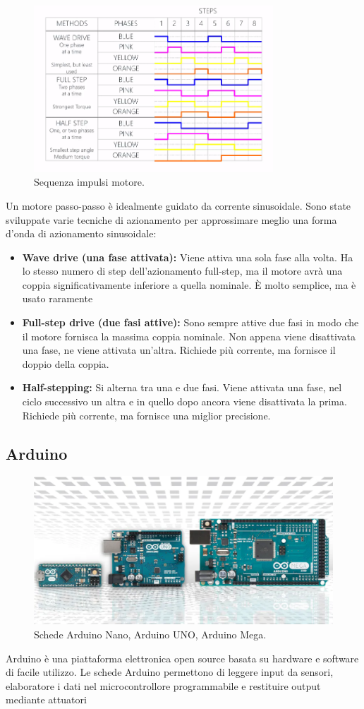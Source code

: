 \documentclass[12pt,oneside,a4paper]{article}
\begin{document}
\begin{figure}[ht!]
    \centering
    \includegraphics[width=0.8\textwidth]{figures/motor-sequence.png}
    \caption{Sequenza impulsi motore.}
\end{figure}
Un motore passo-passo è idealmente guidato da corrente sinusoidale. Sono state sviluppate varie tecniche di azionamento per approssimare meglio una forma d'onda di azionamento sinusoidale:
\begin{itemize}
    \item \textbf{Wave drive (una fase attivata): } Viene attiva una sola fase alla volta. Ha lo stesso numero di step dell'azionamento full-step, ma il motore avrà una coppia significativamente inferiore a quella nominale. È molto semplice, ma è usato raramente
    \item \textbf{Full-step drive (due fasi attive): } Sono sempre attive due fasi in modo che il motore fornisca la massima coppia nominale. Non appena viene disattivata una fase, ne viene attivata un'altra. Richiede più corrente, ma fornisce il doppio della coppia.
    \item \textbf{Half-stepping: } Si alterna tra una e due fasi. Viene attivata una fase, nel ciclo successivo un altra e in quello dopo ancora viene disattivata la prima. Richiede più corrente, ma fornisce una miglior precisione.
\end{itemize}


\subsection{Arduino}
\begin{figure}[!htb]
    \centering
    \includegraphics[width=0.5\linewidth]{figures/arduino.png}
    \caption{Schede Arduino Nano, Arduino UNO, Arduino Mega.}
\end{figure}
Arduino\cite{Arduino} è una piattaforma elettronica open source basata su hardware e software di facile utilizzo. Le schede Arduino permettono di leggere input da sensori, elaboratore i dati nel microcontrollore programmabile e restituire output mediante attuatori
\end{document}
